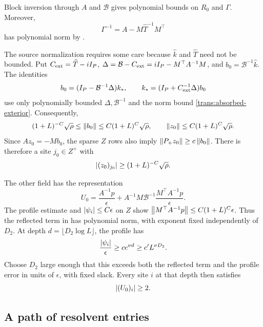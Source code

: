 Block inversion through $A$ and $\mathcal B$ gives
polynomial bounds on $R_0$ and $\Gamma$. Moreover,
\begin{equation}
 \Gamma^{-1}=A-M\widehat T^{-1}M^\top
 \label{trans:gamma-inverse}
\end{equation}
has polynomial norm by .

The source normalization requires some care because $\widehat k$
and $\widehat T$ need not be bounded. Put
$C_{\rm ext}=\widehat T-iI_P$, $\Delta=\mathcal B-C_{\rm ext}
=iI_P-M^\top A^{-1}M$, and $b_0=\mathcal B^{-1}\widehat k$.
The identities
\begin{equation}
 b_0=(I_P-\mathcal B^{-1}\Delta)k_*,\qquad
 k_*=(I_P+C_{\rm ext}^{-1}\Delta)b_0
 \label{trans:source-comparison}
\end{equation}
use only polynomially bounded $\Delta,\mathcal B^{-1}$ and the
norm bound \cref{trans:absorbed-exterior}. Consequently,
\begin{equation}
 (1+L)^{-C}\sqrt\rho\le\left\lVert b_0\right\rVert
 \le C(1+L)^C\sqrt\rho,\qquad
 \left\lVert z_0\right\rVert\le C(1+L)^C\sqrt\rho.
 \label{trans:source-size}
\end{equation}
Since $Az_0=-Mb_0$, the sparse $Z$ rows also imply
$\left\lVert P_+z_0\right\rVert\ge c\left\lVert b_0\right\rVert$. There is therefore a site
$j_0\in Z^+$ with
\begin{equation}
 \left\lvert(z_0)_{j_0}\right\rvert\ge(1+L)^{-C}\sqrt\rho.
 \label{trans:initial-component}
\end{equation}

The other field has the representation
\begin{equation}
 U_0=\frac{A^{-1}p}{\epsilon}
 +A^{-1}M\mathcal B^{-1}
       \frac{M^\top A^{-1}p}{\epsilon}.
 \label{trans:reflected-field}
\end{equation}
The profile estimate and $\left\lvert\psi_i\right\rvert\le C\epsilon$ on $Z$ show
$\left\lVert M^\top A^{-1}p\right\rVert\le C(1+L)^C\epsilon$. Thus the reflected
term in  has polynomial norm, with exponent
fixed independently of $D_2$. At depth
$d=\lfloor D_2\log L\rfloor$, the profile has
\[
 \frac{\left\lvert\psi_i\right\rvert}\epsilon\ge c e^{\nu d}
 \ge c' L^{\nu D_2}.
\]
Choose $D_2$ large enough that this exceeds both the reflected term
and the profile error in units of $\epsilon$, with fixed slack.
Every site $i$ at that depth then satisfies
\begin{equation}
 \left\lvert(U_0)_i\right\rvert\ge2.
 \label{trans:terminal-field}
\end{equation}

\subsection{A path of resolvent entries}

